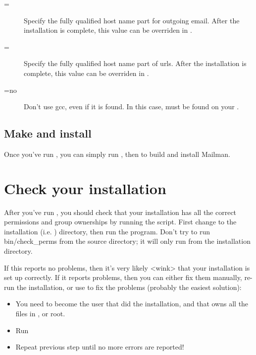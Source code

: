 \documentclass{howto}
\begin{document}
\begin{description}
\item[=]
    Specify the fully qualified host name part for outgoing email.  After the
    installation is complete, this value can be overriden in
    .

\item[=]
    Specify the fully qualified host name part of urls.  After the
    installation is complete, this value can be overriden in
    .

\item[=no]
    Don't use gcc, even if it is found.  In this case,  must be
    found on your .

\end{description}

\subsection{Make and install}

Once you've run , you can simply run , then
 to build and install Mailman.

\section{Check your installation}

After you've run , you should check that your
installation has all the correct permissions and group ownerships by running
the  script.  First change to the installation
(i.e. ) directory, then run the 
program.  Don't try to run bin/check_perms from the source directory; it will
only run from the installation directory.

If this reports no problems, then it's very likely <wink> that your
installation is set up correctly.  If it reports problems, then you can either
fix them manually, re-run the installation, or use 
to fix the problems (probably the easiest solution):

\begin{itemize}
\item You need to become the user that did the installation, and that owns all
      the files in , or root.

\item Run 

\item Repeat previous step until no more errors are reported!
\end{itemize}
\end{document}
